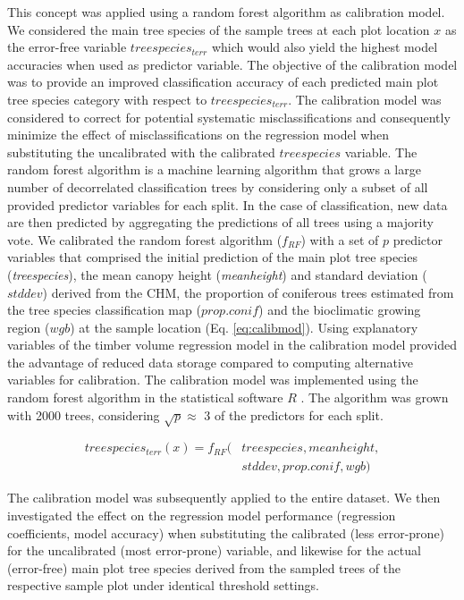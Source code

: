 {This concept was applied using a random forest algorithm \citep{breiman2001} as calibration model. We considered the main tree species of the sample trees at each plot location $x$ as the error-free variable $treespecies_{terr}$ which would also yield the highest model accuracies when used as predictor variable. The objective of the calibration model was to provide an improved classification accuracy of each predicted main plot tree species category with respect to $treespecies_{terr}$. The calibration model was considered to correct for potential systematic misclassifications and consequently minimize the effect of misclassifications on the regression model when substituting the uncalibrated with the calibrated $treespecies$ variable. The random forest algorithm is a machine learning algorithm that grows a large number of decorrelated classification trees by considering only a subset of all provided predictor variables for each split. In the case of classification, new data are then predicted by aggregating the predictions of all trees using a majority vote. We calibrated the random forest algorithm ($f_{RF}$) with a set of $p$ predictor variables that comprised the initial prediction of the main plot tree species (\textit{treespecies}), the mean canopy height (\textit{meanheight}) and standard deviation ($stddev$) derived from the CHM, the proportion of coniferous trees estimated from the tree species classification map ($prop.conif$) and the bioclimatic growing region ($wgb$) at the sample location (Eq. \ref{eq:calibmod}). Using explanatory variables of the timber volume regression model in the calibration model provided the advantage of reduced data storage compared to computing alternative variables for calibration. The calibration model was implemented using the random forest algorithm \citep{liaw2002} in the statistical software $R$ \citep{R}. The algorithm was grown with 2000 trees, considering $\sqrt{p} \approx$ 3 of the predictors for each split.\par
	
	\begin{equation} \label{eq:calibmod}
	\begin{split}
	treespecies_{terr}(x) = f_{RF}(&treespecies, meanheight, \\
	&stddev, prop.conif, wgb)
	\end{split}
	\end{equation}
	
	The calibration model was subsequently applied to the entire dataset. We then investigated the effect on the regression model performance (regression coefficients, model accuracy) when substituting the calibrated (less error-prone) for the uncalibrated (most error-prone) variable, and likewise for the actual (error-free) main plot tree species derived from the sampled trees of the respective sample plot under identical threshold settings.\par
	
}

